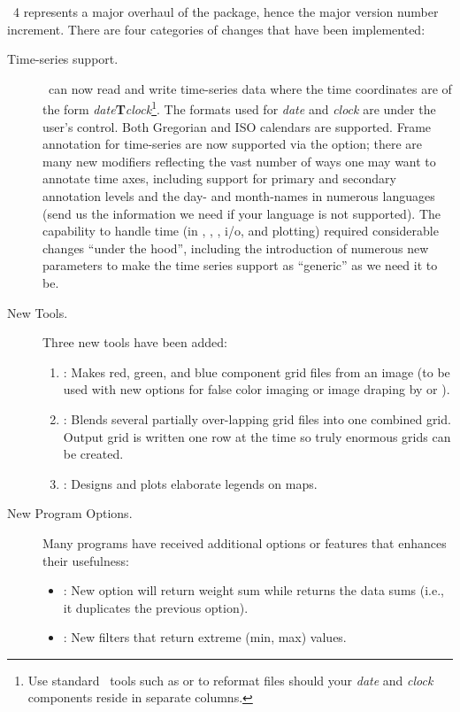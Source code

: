 \GMT\ 4 represents a major overhaul of the package, hence the major version number increment.  There are four
categories of changes that have been implemented:
\begin{description}
\item [Time-series support.]  \GMT\ can now read and write time-series data where
the time coordinates are of the form {\it date}{\bf T}{\it clock}\footnote{Use standard
\UNIX\ tools such as  or  to reformat files should
your {\it date} and {\it clock} components reside in separate columns.}.  The formats
used for {\it date} and {\it clock} are under the user's control.  Both Gregorian
and ISO calendars are supported.  Frame annotation for time-series are now supported
via the  option; there are many new modifiers reflecting the vast number of
ways one may want to annotate time axes, including support for primary and secondary
annotation levels and the day- and month-names in numerous languages (send us the information
we need if your language is not supported).  The capability to handle time (in ,
, , i/o, and plotting) required considerable changes ``under the hood'',
including the introduction of numerous new  parameters to make
the time series support as ``generic'' as we need it to be.
\item [New Tools.]  Three new tools have been added:
\begin{enumerate}
\item {}: Makes red, green, and blue component grid files from an image (to be
used with new options for false color imaging or image draping by  or ).
\item {}: Blends several partially over-lapping grid files into one combined grid.  Output
grid is written one row at the time so truly enormous grids can be created.
\item {}: Designs and plots elaborate legends on maps.
\end{enumerate}
\item [New Program Options.]  Many programs have received additional options or
features that enhances their usefulness:
\begin{itemize}
\item {}:	New option  will return weight sum while  returns
the data sums (i.e., it duplicates the previous  option).
\item {}:	New filters  that return extreme (min, max) values.

\end{itemize}
\end{description}

